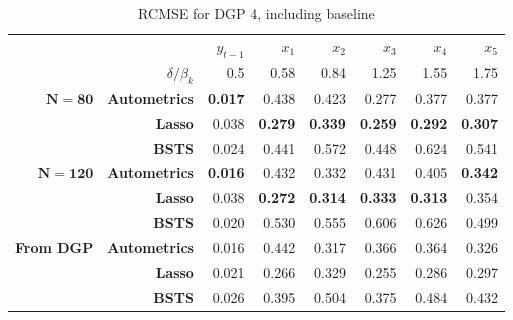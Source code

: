 \begin{table}[htbp]
  \centering

   \begin{tabular}{r|r|rrrrrr}

          &       & $y_{t-1}$ & $x_{1}$ & $x_{2}$ & $x_{3}$ & $x_{4}$ & $x_{5}$ \\
          & $\delta/\beta_{k}$ &   0.5 & 0.58 &0.84 &1.25 &  1.55 & 1.75  \\
           \hline
    $\bm{N=80} $& \textbf{Autometrics} & \textbf{0.017} & 0.438 & 0.423 & 0.277 & 0.377 & 0.377 \\
    \textbf{} & \textbf{Lasso} & 0.038 & \textbf{0.279} & \textbf{0.339} & \textbf{0.259} & \textbf{0.292} & \textbf{0.307} \\
    \textbf{} & \textbf{BSTS} & 0.024 & 0.441 & 0.572 & 0.448 & 0.624 & 0.541 \\
    \hline
    $\bm{N=120}$ & \textbf{Autometrics} & \textbf{0.016} & 0.432 & 0.332 & 0.431 & 0.405 & \textbf{0.342} \\
    \textbf{} & \textbf{Lasso} & 0.038 & \textbf{0.272} & \textbf{0.314} & \textbf{0.333} &\textbf{ 0.313} & 0.354 \\
    \textbf{} & \textbf{BSTS} & 0.020 & 0.530 & 0.555 & 0.606 & 0.626 & 0.499 \\
    \hline
    \textbf{From DGP} & \textbf{Autometrics} & 0.016 & 0.442 & 0.317 & 0.366 & 0.364 & 0.326 \\
          & \textbf{Lasso} & 0.021 & 0.266 & 0.329 & 0.255 & 0.286 & 0.297 \\
          & \textbf{BSTS} & 0.026 & 0.395 & 0.504 & 0.375 & 0.484 & 0.432 \\

    \end{tabular}%
      \caption{RCMSE for DGP 4, including baseline}
  \label{DGP4CMSE}%
\end{table}%


